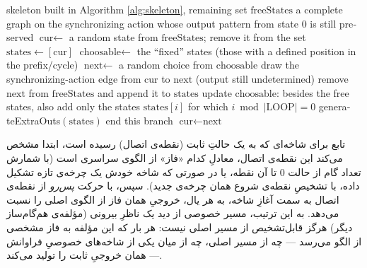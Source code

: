 \documentclass[a4paper,12pt]{article}
\numberwithin{algorithm}{section}
\begin{document}
\begin{algorithm}[H]
\caption{}
\label{alg:extras}
\begin{latin}
\begin{algorithmic}[1]
\REQUIRE skeleton built in Algorithm \ref{alg:skeleton}, remaining set $\text{freeStates}$
\ENSURE a complete graph on the synchronizing action whose output pattern from state $0$ is still preserved
    \STATE $\text{cur} \leftarrow$ a random state from $\text{freeStates}$; remove it from the set
    \STATE $\text{states} \leftarrow [\text{cur}]$
    \STATE $\text{choosable} \leftarrow$ the ``fixed'' states (those with a defined position in the prefix/cycle)
    \REPEAT
        \STATE $\text{next} \leftarrow$ a random choice from $\text{choosable}$
        \STATE draw the synchronizing-action edge from $\text{cur}$ to $\text{next}$ (output still undetermined)
            \STATE remove $\text{next}$ from $\text{freeStates}$ and append it to $\text{states}$
            \STATE update $\text{choosable}$: besides the free states, also add only the states $\text{states}[i]$ for which $i \bmod |\text{LOOP}| = 0$
        \ELSE
            \STATE generateExtraOuts$(\text{states})$ 
            \STATE end this branch
        \ENDIF
        \STATE $\text{cur} \leftarrow \text{next}$
\ENDWHILE
\end{algorithmic}
\end{latin}
\end{algorithm}

تابع  برای شاخه‌ای که به یک حالتِ ثابت (نقطه‌ی اتصال) رسیده است، ابتدا مشخص می‌کند این نقطه‌ی اتصال، معادلِ کدام «فاز» از الگوی سراسری است (با شمارش تعداد گام از حالت $0$ تا آن نقطه، یا در صورتی که شاخه خودش یک چرخه‌ی تازه تشکیل داده، با تشخیصِ نقطه‌ی شروع همان چرخه‌ی جدید). سپس، با حرکت \emph{پس‌رو} از نقطه‌ی اتصال به سمت آغازِ شاخه، به هر یال، خروجیِ همان فاز از الگوی اصلی را نسبت می‌دهد. به این ترتیب، مسیر خصوصی از دید یک ناظرِ بیرونی (مؤلفه‌ی هم‌گام‌ساز دیگر) هرگز قابل‌تشخیص از مسیر اصلی نیست: هر بار که این مؤلفه به فاز مشخصی از الگو می‌رسد — چه از مسیر اصلی، چه از میان یکی از شاخه‌های خصوصیِ فراوانش — همان خروجیِ ثابت را تولید می‌کند.
\end{document}
